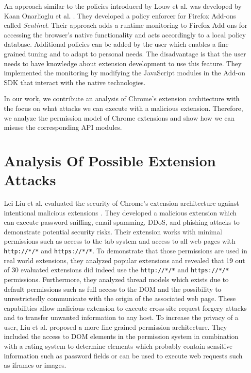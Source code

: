 	An approach similar to the policies introduced by Louw et al. was developed by Kaan Onarlioglu et al. \cite{cs2015sentinel}. They developed a policy enforcer for Firefox Add-ons called \textit{Sentinel}. Their approach adds a runtime monitoring to Firefox Add-ons for accessing the browser's native functionality and acts accordingly to a local policy database. Additional policies can be added by the user which enables a fine grained tuning and to adapt to personal needs. The disadvantage is that the user needs to have knowledge about extension development to use this feature. They implemented the monitoring by modifying the JavaScript modules in the Add-on SDK that interact with the native technologies.  
	
	In our work, we contribute an analysis of Chrome's extension architecture with the focus on what attacks we can execute with a malicious extension. Therefore, we analyze the permission model of Chrome extensions and show how we can misuse the corresponding API modules.  %



\section{Analysis Of Possible Extension Attacks}
	
	Lei Liu et al. evaluated the security of Chrome's extension architecture against intentional malicious extensions \cite{Liu12chromeextensions:}. They developed a malicious extension which can execute password sniffing, email spamming, DDoS, and phishing attacks to demonstrate potential security risks. Their extension works with minimal permissions such as access to the tab system and access to all web pages with \texttt{http://*/*} and \texttt{https://*/*}. To demonstrate that those permissions are used in real world extensions, they analyzed popular extensions and revealed that 19 out of 30 evaluated extensions did indeed use the \texttt{http://*/*} and \texttt{https://*/*} permissions. Furthermore, they analyzed thread models which exists due to default permissions such as full access to the DOM and the possibility to unrestrictedly communicate with the origin of the associated web page. These capabilities allow malicious extension to execute cross-site request forgery attacks and to transfer unwanted information to any host. To increase the privacy of a user, Liu et al. proposed a more fine grained permission architecture. They included the access to DOM elements in the permission system in combination with a rating system to determine elements which probably contain sensitive information such as password fields or can be used to execute web requests such as iframes or images. \\
	

